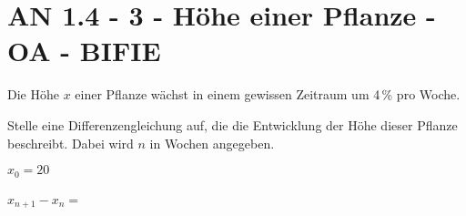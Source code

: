 \section{AN 1.4 - 3 - Höhe einer Pflanze - OA - BIFIE}

\begin{beispiel}[AN 1.4]{1} %
Die Höhe $x$ einer Pflanze wächst in einem gewissen Zeitraum um 4\,\% pro Woche.

Stelle eine Differenzengleichung auf, die die Entwicklung der Höhe dieser Pflanze beschreibt. Dabei wird $n$ in Wochen angegeben.


$x_0=20$

$x_{n+1}-x_n=$\,
\end{beispiel}